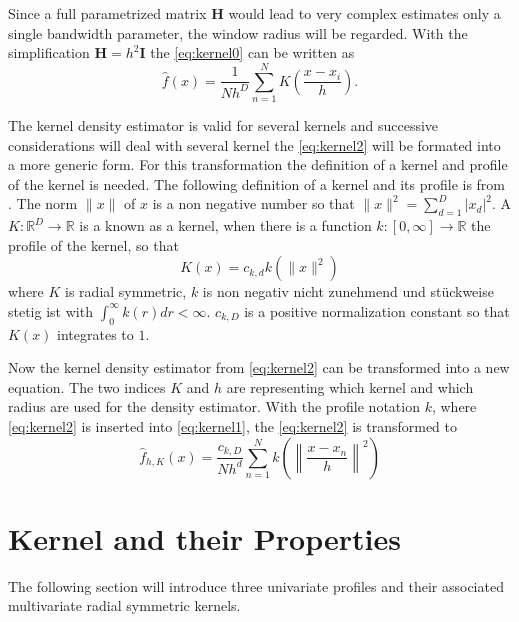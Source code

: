 Since a full parametrized matrix $\mathbf{H}$ would lead to very complex estimates
only a single bandwidth parameter, the window radius will be regarded. With the
simplification $\mathbf{H} = h^2 \mathbf{I}$ the \autoref{eq:kernel0} can be 
written as
\begin{equation}\label{eq:kernel2}
	\hat{f}(x) = \frac{1}{Nh^D}\sum_{n=1}^N K\left( \frac{x - x_i}{h} \right).
\end{equation}

The kernel density estimator is valid for several kernels and successive
considerations will deal with several kernel the \autoref{eq:kernel2} will be
formated into a more generic form. For this transformation the definition of a
kernel and profile of the kernel is needed. The following definition of a kernel
and its profile is from \citeauthor{citeulike:2522867}
\citep{citeulike:2522867}. The norm $\lVert x \rVert$ of $x$ is a non negative number 
so that $\lVert x \rVert^2 = \sum_{d = 1}^D|x_d|^2$.
A $K:\mathbb{R}^D \rightarrow \mathbb{R}$ is
a known as a kernel, when there is a function $k:[0, \infty] \rightarrow
\mathbb{R}$ the profile of the kernel, so that
\begin{equation}\label{eq:kernel3}
	K(x)=c_{k,d}k(\lVert x \rVert^2)
\end{equation}
where $K$ is radial symmetric, $k$ is non negativ {\color{iRed} nicht zunehmend
und stückweise stetig ist} with $\int_0^{\infty} k(r) dr < \infty$. $c_{k,D}$ is
a positive normalization constant so that $K(x)$ integrates to $1$. 

Now the kernel density estimator from \autoref{eq:kernel2} can be transformed
into a new equation. The two indices $K$ and $h$ are representing which kernel
and which radius are used for the density estimator. With the profile notation
$k$, where \autoref{eq:kernel2} is inserted into \autoref{eq:kernel1}, the
\autoref{eq:kernel2} is transformed to
\begin{equation}\label{eq:kernel4}
	\hat{f}_{h,K}(x) = \frac{c_{k,D}}{Nh^d}
	\sum_{n = 1}^N k\left(\left\lVert \frac{x-x_n}{h} \right\rVert^2\right)
\end{equation}



\section{Kernel and their Properties} %
\label{sec:kernel_properties}
The following section will introduce three univariate profiles and their associated
multivariate radial symmetric kernels. 


